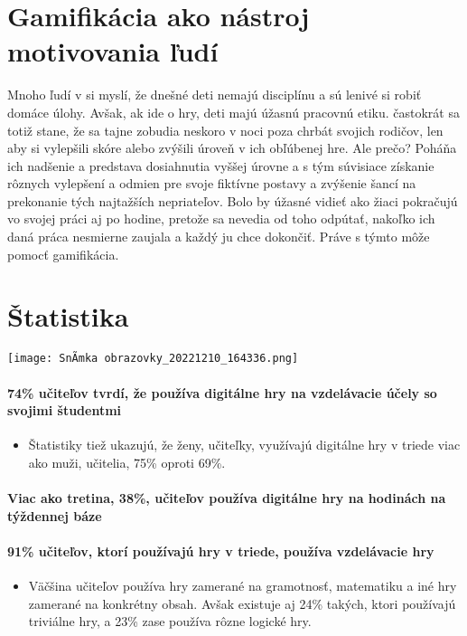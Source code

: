 \documentclass[10pt,twoside,slovak,a4paper]{article}
\begin{document}
\section{Gamifikácia ako nástroj motivovania ľudí}
Mnoho ľudí v si myslí, že dnešné deti nemajú disciplínu a sú lenivé si robiť domáce úlohy. Avšak, ak ide o hry, deti majú úžasnú pracovnú etiku. častokrát sa totiž stane, že sa tajne zobudia neskoro v noci poza chrbát svojich rodičov, len aby si vylepšili skóre alebo zvýšili úroveň v ich obľúbenej hre. Ale prečo? Poháňa ich nadšenie a predstava dosiahnutia vyššej úrovne a s tým súvisiace získanie rôznych vylepšení a odmien pre svoje fiktívne postavy a zvýšenie šancí na prekonanie tých najtažších nepriateľov. Bolo by úžasné vidieť ako žiaci pokračujú vo svojej práci aj po hodine, pretože sa nevedia od toho odpútať, nakoľko ich daná práca nesmierne zaujala a každý ju chce dokončiť. Práve s týmto môže pomocť gamifikácia.

\section{Štatistika}
\texttt{[image: SnÃ­mka obrazovky\_20221210\_164336.png]}
\cite{soo}
\paragraph{74\% učiteľov tvrdí, že používa digitálne hry na vzdelávacie účely so svojimi študentmi\cite{academic}}
    \begin{itemize}
        \item Štatistiky tiež ukazujú, že ženy, učiteľky, využívajú digitálne hry v triede viac ako muži, učitelia, 75\% oproti 69\%.
    \end{itemize}
\paragraph{Viac ako tretina, 38\%, učiteľov používa digitálne hry na hodinách na týždennej báze\cite{umich}}
\paragraph{91\% učiteľov, ktorí používajú hry v triede, používa vzdelávacie hry\cite{academic}}
    \begin{itemize}
        \item Väčšina učiteľov používa hry zamerané na gramotnosť, matematiku a iné hry zamerané na konkrétny obsah. Avšak existuje aj 24\% takých, ktori používajú triviálne hry, a 23\% zase používa rôzne logické hry.
    \end{itemize}
\end{document}
